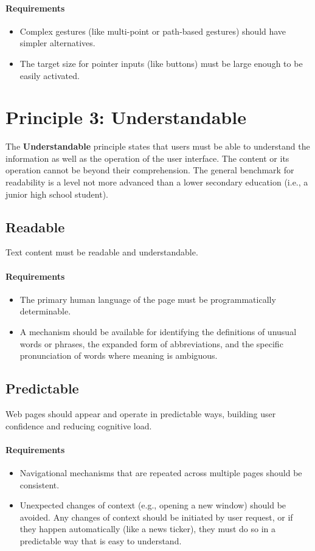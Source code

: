 \documentclass{scrbook}
\begin{document}
\paragraph{Requirements}
\begin{itemize}
    \item Complex gestures (like multi-point or path-based gestures) should have simpler alternatives.
    \item The target size for pointer inputs (like buttons) must be large enough to be easily activated.
\end{itemize}

\section{Principle 3: Understandable}

The \textbf{Understandable} principle states that users must be able to understand the information as well as the operation of the user interface. The content or its operation cannot be beyond their comprehension. The general benchmark for readability is a level not more advanced than a lower secondary education (i.e., a junior high school student).

\subsection{Readable}
Text content must be readable and understandable.

\paragraph{Requirements}
\begin{itemize}
    \item The primary human language of the page must be programmatically determinable.
    \item A mechanism should be available for identifying the definitions of unusual words or phrases, the expanded form of abbreviations, and the specific pronunciation of words where meaning is ambiguous.
\end{itemize}

\subsection{Predictable}
Web pages should appear and operate in predictable ways, building user confidence and reducing cognitive load.

\paragraph{Requirements}
\begin{itemize}
    \item Navigational mechanisms that are repeated across multiple pages should be consistent.
    \item Unexpected changes of context (e.g., opening a new window) should be avoided. Any changes of context should be initiated by user request, or if they happen automatically (like a news ticker), they must do so in a predictable way that is easy to understand.
\end{itemize}
\end{document}

